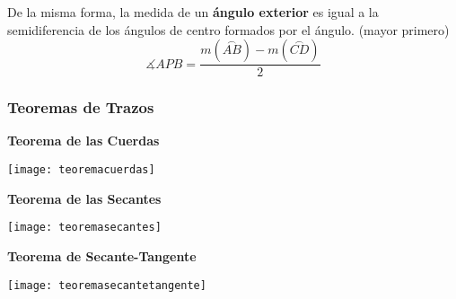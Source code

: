 De la misma forma, la medida de un \textbf{ángulo exterior} es igual a la semidiferencia de los ángulos de centro formados por el ángulo. (mayor primero)
\begin{equation*}
    \measuredangle APB = \frac{m(\stackrel\frown{AB}) - m(\stackrel\frown{CD})}{2}
\end{equation*}

\subsubsection{Teoremas de Trazos}
\textbf{Teorema de las Cuerdas}\\

\begin{center}
\texttt{[image: teoremacuerdas]}
\end{center}
\textbf{Teorema de las Secantes}\\
\begin{center}
\texttt{[image: teoremasecantes]}
\end{center}
\textbf{Teorema de Secante-Tangente}\\
\begin{center}
\texttt{[image: teoremasecantetangente]}
\end{center}